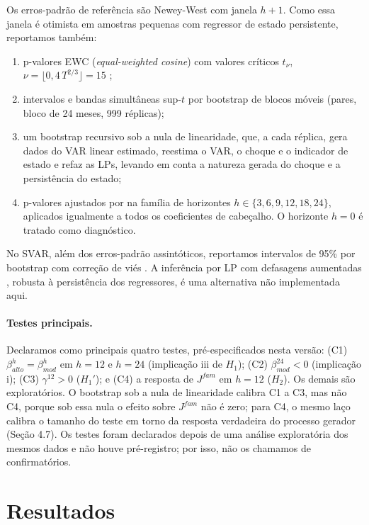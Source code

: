 \documentclass[12pt,a4paper]{article}
\begin{document}
Os erros-padrão de referência são Newey-West com janela $h + 1$. Como essa janela é otimista em amostras pequenas com regressor de estado persistente, reportamos também:
\begin{enumerate}
    \item p-valores EWC (\textit{equal-weighted cosine}) com valores críticos $t_\nu$, $\nu = \lfloor 0{,}4\,T^{2/3} \rfloor = 15$ \citep{lazarus2018har};
    \item intervalos e bandas simultâneas sup-$t$ \citep{montielolea2019simultaneous} por bootstrap de blocos móveis (pares, bloco de 24 meses, 999 réplicas);
    \item um bootstrap recursivo sob a nula de linearidade, que, a cada réplica, gera dados do VAR linear estimado, reestima o VAR, o choque e o indicador de estado e refaz as LPs, levando em conta a natureza gerada do choque e a persistência do estado;
    \item p-valores ajustados por \citet{holm1979simple} na família de horizontes $h \in \{3, 6, 9, 12, 18, 24\}$, aplicados igualmente a todos os coeficientes de cabeçalho. O horizonte $h = 0$ é tratado como diagnóstico.
\end{enumerate}
No SVAR, além dos erros-padrão assintóticos, reportamos intervalos de 95\% por bootstrap com correção de viés \citep{kilian1998small}. A inferência por LP com defasagens aumentadas \citep{montielolea2021local}, robusta à persistência dos regressores, é uma alternativa não implementada aqui.

\paragraph{Testes principais.} Declaramos como principais quatro testes, pré-especificados nesta versão: (C1) $\beta_{alto}^h = \beta_{mod}^h$ em $h = 12$ e $h = 24$ (implicação iii de $H_1$); (C2) $\beta_{mod}^{24} < 0$ (implicação i); (C3) $\gamma^{12} > 0$ ($H_1'$); e (C4) a resposta de $J^{fam}$ em $h = 12$ ($H_2$). Os demais são exploratórios. O bootstrap sob a nula de linearidade calibra C1 a C3, mas não C4, porque sob essa nula o efeito sobre $J^{fam}$ não é zero; para C4, o mesmo laço calibra o tamanho do teste em torno da resposta verdadeira do processo gerador (Seção 4.7). Os testes foram declarados depois de uma análise exploratória dos mesmos dados e não houve pré-registro; por isso, não os chamamos de confirmatórios.

\section{Resultados}
\end{document}

